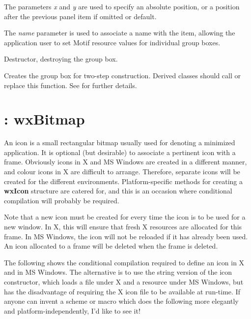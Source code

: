 The parameters {\it x} and {\it y} are used to specify an absolute
position, or a position after the previous panel item if omitted or
default.

The {\it name} parameter is used to associate a name with the item,
allowing the application user to set Motif resource values for
individual group boxes.



Destructor, destroying the group box.



Creates the group box for two-step construction. Derived classes
should call or replace this function. See \rtfsp
for further details.

\section{: wxBitmap}\label{wxicon}

An icon is a small rectangular bitmap usually used for denoting a
minimized application. It is optional (but desirable) to associate a
pertinent icon with a frame. Obviously icons in X and MS Windows are
created in a different manner, and colour icons in X are difficult
to arrange. Therefore, separate icons will be created for the different
environments.  Platform-specific methods for creating a {\bf wxIcon}\rtfsp
structure are catered for, and this is an occasion where conditional
compilation will probably be required.

Note that a new icon must be created for every time the icon is to be
used for a new window. In X, this will ensure that fresh X resources
are allocated for this frame. In MS Windows, the icon will not be
reloaded if it has already been used. An icon allocated to a frame will
be deleted when the frame is deleted.

The following shows the conditional compilation required to define an
icon in X and in MS Windows. The alternative is to use the string
version of the icon constructor, which loads a file under X and a
resource under MS Windows, but has the disadvantage of requiring the
X icon file to be available at run-time. If anyone can invent a
scheme or macro which does the following more elegantly and
platform-independently, I'd like to see it!

